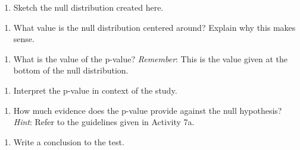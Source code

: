 \documentclass[
]{report}
\providecommand{\tightlist}{%
  \setlength{\itemsep}{0pt}\setlength{\parskip}{0pt}}
\begin{document}
\begin{enumerate}
\def\labelenumi{\arabic{enumi}.}
\setcounter{enumi}{16}
\tightlist
\item
  Sketch the null distribution created here.
\end{enumerate}

\vspace{1.5in}

\begin{enumerate}
\def\labelenumi{\arabic{enumi}.}
\setcounter{enumi}{17}
\tightlist
\item
  What value is the null distribution centered around? Explain why this makes sense.
\end{enumerate}

\vspace{.8in}

\begin{enumerate}
\def\labelenumi{\arabic{enumi}.}
\setcounter{enumi}{18}
\tightlist
\item
  What is the value of the p-value? \emph{Remember}: This is the value given at the bottom of the null distribution.
\end{enumerate}

\vspace{0.2in}

\begin{enumerate}
\def\labelenumi{\arabic{enumi}.}
\setcounter{enumi}{19}
\tightlist
\item
  Interpret the p-value in context of the study.
\end{enumerate}

\vspace{1in}

\begin{enumerate}
\def\labelenumi{\arabic{enumi}.}
\setcounter{enumi}{20}
\tightlist
\item
  How much evidence does the p-value provide against the null hypothesis? \emph{Hint}: Refer to the guidelines given in Activity 7a.
\end{enumerate}

\vspace{0.4in}

\begin{enumerate}
\def\labelenumi{\arabic{enumi}.}
\setcounter{enumi}{21}
\tightlist
\item
  Write a conclusion to the test.
\end{enumerate}

\vspace{1in}
\end{document}
